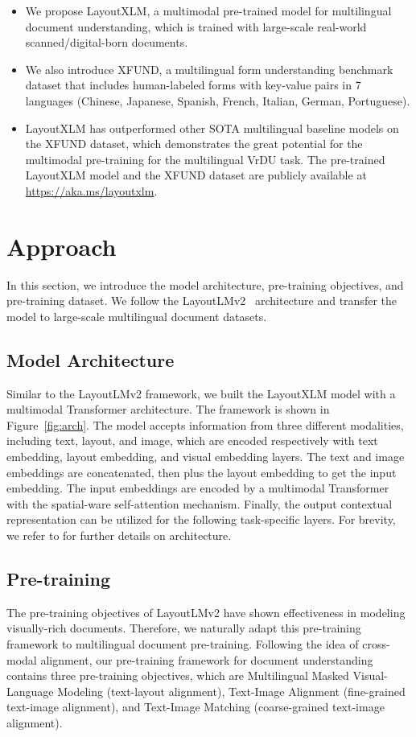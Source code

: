 \documentclass[11pt]{article}
\newcommand{\task}{\textsc{XFUND}\xspace}
\begin{document}
\begin{itemize}
	\item We propose LayoutXLM, a multimodal pre-trained model for multilingual document understanding, which is trained with large-scale real-world scanned/digital-born documents.
	\item We also introduce \task, a multilingual form understanding benchmark dataset that includes human-labeled forms with key-value pairs in 7 languages (Chinese, Japanese, Spanish, French, Italian, German, Portuguese).
	\item LayoutXLM has outperformed other SOTA multilingual baseline models on the \task dataset, which demonstrates the great potential for the multimodal pre-training for the multilingual VrDU task. The pre-trained LayoutXLM model and the \task dataset are publicly available at \url{https://aka.ms/layoutxlm}.
\end{itemize}





\section{Approach}
In this section, we introduce the model architecture, pre-training objectives, and pre-training dataset. We follow the LayoutLMv2~\cite{xu2020layoutlmv2} architecture and transfer the model to large-scale multilingual document datasets.



\subsection{Model Architecture}
Similar to the LayoutLMv2 framework, we built the LayoutXLM model with a multimodal Transformer architecture. The framework is shown in Figure~\ref{fig:arch}. The model accepts information from three different modalities, including text, layout, and image, which are encoded respectively with text embedding, layout embedding, and visual embedding layers. The text and image embeddings are concatenated, then plus the layout embedding to get the input embedding. The input embeddings are encoded by a multimodal Transformer with the spatial-ware self-attention mechanism. Finally, the output contextual representation can be utilized for the following task-specific layers. For brevity, we refer to \cite{xu2020layoutlmv2} for further details on architecture.

\subsection{Pre-training}
The pre-training objectives of LayoutLMv2 have shown effectiveness in modeling visually-rich documents. Therefore, we naturally adapt this pre-training framework to multilingual document pre-training. Following the idea of cross-modal alignment, our pre-training framework for document understanding contains three pre-training objectives, which are Multilingual Masked Visual-Language Modeling (text-layout alignment), Text-Image Alignment (fine-grained text-image alignment), and Text-Image Matching (coarse-grained text-image alignment).
\end{document}
